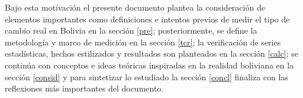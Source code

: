 \documentclass[12pt,letterpaper]{article}
\begin{document}


Bajo esta motivación el presente documento plantea la consideración de elementos importantes como definiciones e intentos previos de medir el tipo de cambio real en Bolivia en la sección \ref{pre}; posteriormente, se define la metodología y marco de medición en la sección \ref{tcr}; la verificación de series estadísticas, hechos estilizados y resultados son planteados en la sección \ref{calc}; se continúa con conceptos e ideas teóricas inspiradas en la realidad boliviana en la sección \ref{consid} y para sintetizar lo estudiado la sección \ref{concl} finaliza con las reflexiones más importantes del documento.
\end{document}
